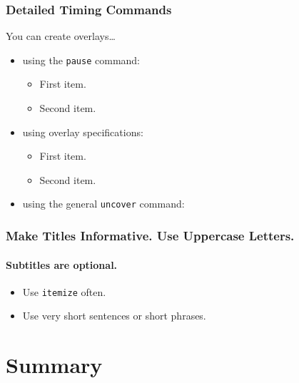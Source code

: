 \documentclass[leqno]{beamer}
\begin{document}
\begin{frame}
  \frametitle{Detailed Timing Commands}
  You can create overlays\dots
  \begin{itemize}
  \item using the \texttt{pause} command:
    \begin{itemize}
    \item
      First item.
      \pause
    \item    
      Second item.
    \end{itemize}
  \item
    using overlay specifications:
    \begin{itemize}
    \item<3->
      First item.
    \item<4->
      Second item.
    \end{itemize}
  \item
    using the general \texttt{uncover} command:
    \begin{itemize}
    \end{itemize}
  \end{itemize}
\end{frame}








\begin{frame}
  \frametitle{Make Titles Informative. Use Uppercase Letters.}
  \framesubtitle{Subtitles are optional.}

  \begin{itemize}
  \item
    Use \texttt{itemize} often.
  \item
    Use very short sentences or short phrases.
  \end{itemize}
\end{frame}


\section*{Summary}
\end{document}
